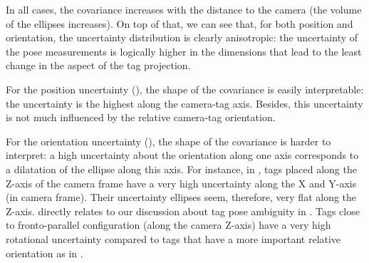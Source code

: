 In all cases, the covariance increases with the distance to the camera (the volume of the ellipses increases).
On top of that, we can see that, for both position and orientation, the uncertainty distribution is clearly anisotropic: 
the uncertainty of the pose measurements is logically higher in the dimensions that lead to the least change in the aspect of the tag projection. 

For the position uncertainty (), the shape of the covariance is easily interpretable: the uncertainty is the highest along the camera-tag axis.
Besides, this uncertainty is not much influenced by the relative camera-tag orientation. 

For the orientation uncertainty (), the shape of the covariance is harder to interpret: a high uncertainty about the orientation along 
one axis corresponds to a dilatation of the ellipse along this axis. For instance, in , tags placed
along the Z-axis of the camera frame have a very high uncertainty along the X and Y-axis (in camera frame). Their uncertainty ellipses seem, therefore, very flat
along the Z-axis.  directly relates to our discussion about tag pose ambiguity in . Tags close
to fronto-parallel configuration (along the camera Z-axis) have a very high rotational uncertainty compared to tags that have a more important relative 
orientation as in .



